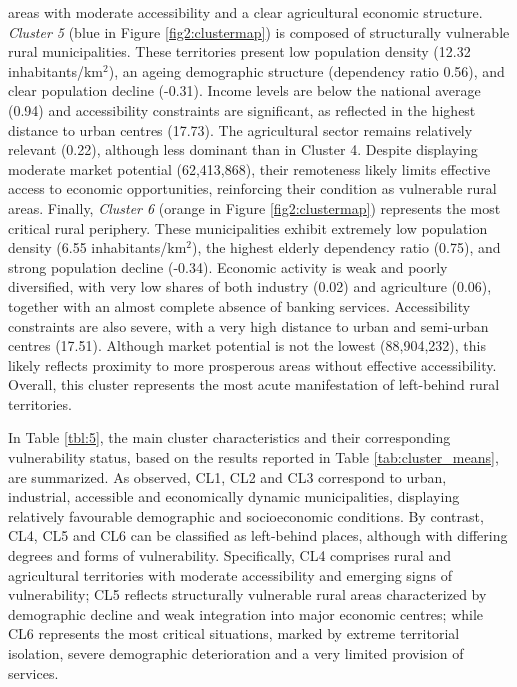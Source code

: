 \documentclass[a4paper,11pt,oneside]{article}
\begin{document}
{areas with moderate accessibility and a clear agricultural economic structure. \textit{Cluster 5} (blue in Figure \ref{fig2:clustermap}) is composed of structurally vulnerable rural municipalities. These territories present low population density (12.32 inhabitants/km$^{2}$), an ageing demographic structure (dependency ratio 0.56), and clear population decline (-0.31). Income levels are below the national average (0.94) and accessibility constraints are significant, as reflected in the highest distance to urban centres (17.73). The agricultural sector remains relatively relevant (0.22), although less dominant than in Cluster 4. Despite displaying moderate market potential (62,413,868), their remoteness likely limits effective access to economic opportunities, reinforcing their condition as vulnerable rural areas. Finally, \textit{Cluster 6} (orange in Figure \ref{fig2:clustermap}) represents the most critical rural periphery. These municipalities exhibit extremely low population density (6.55 inhabitants/km$^{2}$), the highest elderly dependency ratio (0.75), and strong population decline (-0.34). Economic activity is weak and poorly diversified, with very low shares of both industry (0.02) and agriculture (0.06), together with an almost complete absence of banking services. Accessibility constraints are also severe, with a very high distance to urban and semi-urban centres (17.51). Although market potential is not the lowest (88,904,232), this likely reflects proximity to more prosperous areas without effective accessibility. Overall, this cluster represents the most acute manifestation of left-behind rural territories.

}



In Table \ref{tbl:5}, the main cluster characteristics and their corresponding vulnerability status, based on the results reported in Table \ref{tab:cluster_means}, are summarized. As observed, CL1, CL2 and CL3 correspond to urban, industrial, accessible and economically dynamic municipalities, displaying relatively favourable demographic and socioeconomic conditions. By contrast, CL4, CL5 and CL6 can be classified as left-behind places, although with differing degrees and forms of vulnerability. Specifically, CL4 comprises rural and agricultural territories with moderate accessibility and emerging signs of vulnerability; CL5 reflects structurally vulnerable rural areas characterized by demographic decline and weak integration into major economic centres; while CL6 represents the most critical situations, marked by extreme territorial isolation, severe demographic deterioration and a very limited provision of services.
\end{document}
